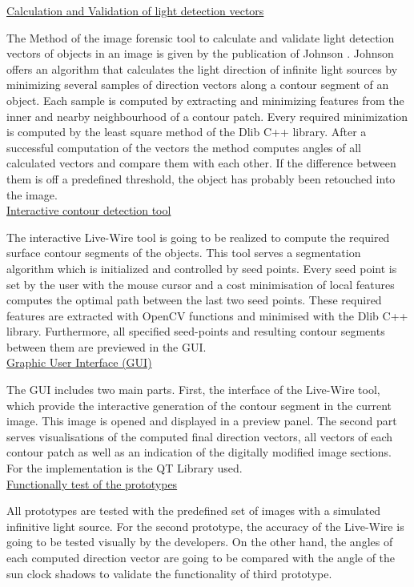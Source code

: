 \underline{Calculation and Validation of light detection vectors }

The Method of the image forensic tool to calculate and validate light detection vectors of objects in an image is given by the publication of Johnson \cite{Johnson}. Johnson offers an algorithm that calculates the light direction of infinite light sources by minimizing several samples of direction vectors along a contour segment of an object. Each sample is computed by extracting and minimizing features from the inner and nearby neighbourhood of a contour patch. Every required minimization is computed by the least square method of the Dlib C++ library.
After a successful computation of the vectors the method computes angles of all calculated vectors and compare them with each other. If the difference between them is off a predefined threshold, the object has probably been retouched into the image. \\


\underline{Interactive contour detection tool} 

The interactive Live-Wire tool \cite{BARRETT1997331} is going to be realized to compute the required surface contour segments of the objects. This tool serves a segmentation algorithm which is initialized and controlled by seed points. Every seed point is set by the user with the mouse cursor and a cost minimisation of local features computes the optimal path between the last two seed points. These required features are extracted with OpenCV functions and minimised with the Dlib C++ library. Furthermore, all specified seed-points and resulting contour segments between them are previewed in the GUI. \\


\underline{Graphic User Interface (GUI)} 

The GUI includes two main parts. First, the interface of the Live-Wire tool, which provide the interactive generation of the contour segment in the current image. This image is opened and displayed in a preview panel. The second part serves visualisations of the computed final direction vectors, all vectors of each contour patch as well as an indication of the digitally modified image sections. For the implementation is the QT Library used. \\ 


\underline{Functionally test of the prototypes} 

All prototypes are tested with the predefined set of images with a simulated infinitive light source. For the second prototype, the accuracy of the Live-Wire is going to be tested visually by the developers. On the other hand, the angles of each computed direction vector are going to be compared with the angle of the sun clock shadows to validate the functionality of  third prototype. \\ 


